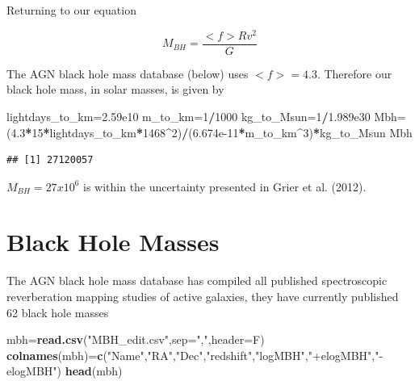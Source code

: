 \documentclass[]{article}
\newenvironment{Shaded}{\begin{snugshade}}{\end{snugshade}}
\newcommand{\DataTypeTok}[1]{\textcolor[rgb]{0.13,0.29,0.53}{#1}}
\newcommand{\DecValTok}[1]{\textcolor[rgb]{0.00,0.00,0.81}{#1}}
\newcommand{\FloatTok}[1]{\textcolor[rgb]{0.00,0.00,0.81}{#1}}
\newcommand{\KeywordTok}[1]{\textcolor[rgb]{0.13,0.29,0.53}{\textbf{#1}}}
\newcommand{\NormalTok}[1]{#1}
\newcommand{\OperatorTok}[1]{\textcolor[rgb]{0.81,0.36,0.00}{\textbf{#1}}}
\newcommand{\StringTok}[1]{\textcolor[rgb]{0.31,0.60,0.02}{#1}}
\begin{document}
Returning to our equation

\[M_{BH}=\frac{<f>Rv^2}{G}\]

The AGN black hole mass database (below) uses \(<f>=4.3\). Therefore our
black hole mass, in solar masses, is given by

\begin{Shaded}
\begin{Highlighting}[]
\NormalTok{lightdays_to_km=}\FloatTok{2.59e10}
\NormalTok{m_to_km=}\DecValTok{1}\OperatorTok{/}\DecValTok{1000}
\NormalTok{kg_to_Msun=}\DecValTok{1}\OperatorTok{/}\FloatTok{1.989e30}
\NormalTok{Mbh=(}\FloatTok{4.3}\OperatorTok{*}\DecValTok{15}\OperatorTok{*}\NormalTok{lightdays_to_km}\OperatorTok{*}\DecValTok{1468}\OperatorTok{^}\DecValTok{2}\NormalTok{)}\OperatorTok{/}\NormalTok{(}\FloatTok{6.674e-11}\OperatorTok{*}\NormalTok{m_to_km}\OperatorTok{^}\DecValTok{3}\NormalTok{)}\OperatorTok{*}\NormalTok{kg_to_Msun}
\NormalTok{Mbh}
\end{Highlighting}
\end{Shaded}

\begin{verbatim}
## [1] 27120057
\end{verbatim}

\(M_{BH}=27x10^6\) is within the uncertainty presented in Grier et al.
(2012).

\hypertarget{black-hole-masses}{%
\section{Black Hole Masses}\label{black-hole-masses}}

The AGN black hole mass database has compiled all published
spectroscopic reverberation mapping studies of active galaxies, they
have currently published 62 black hole masses

\begin{Shaded}
\begin{Highlighting}[]
\NormalTok{mbh=}\KeywordTok{read.csv}\NormalTok{(}\StringTok{"MBH_edit.csv"}\NormalTok{,}\DataTypeTok{sep=}\StringTok{","}\NormalTok{,}\DataTypeTok{header=}\NormalTok{F)}
\KeywordTok{colnames}\NormalTok{(mbh)=}\KeywordTok{c}\NormalTok{(}\StringTok{"Name"}\NormalTok{,}\StringTok{"RA"}\NormalTok{,}\StringTok{"Dec"}\NormalTok{,}\StringTok{"redshift"}\NormalTok{,}\StringTok{"logMBH"}\NormalTok{,}\StringTok{"+elogMBH"}\NormalTok{,}\StringTok{"-elogMBH"}\NormalTok{)}
\KeywordTok{head}\NormalTok{(mbh)}
\end{Highlighting}
\end{Shaded}
\end{document}
